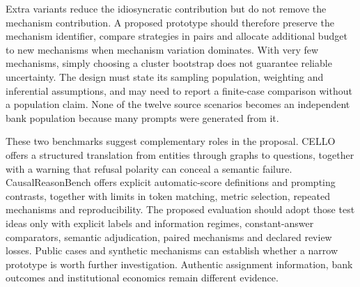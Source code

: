 Extra variants reduce the idiosyncratic contribution but do not remove the
mechanism contribution. A proposed prototype should therefore preserve the
mechanism identifier, compare strategies in pairs and allocate additional
budget to new mechanisms when mechanism variation dominates. With very few
mechanisms, simply choosing a cluster bootstrap does not guarantee reliable
uncertainty. The design must state its sampling population, weighting and
inferential assumptions, and may need to report a finite-case comparison
without a population claim. None of the twelve source scenarios becomes an
independent bank population because many prompts were generated from it.

These two benchmarks suggest complementary roles in the proposal. CELLO
offers a structured translation from entities through graphs to questions,
together with a warning that refusal polarity can conceal a semantic failure.
CausalReasonBench offers explicit automatic-score definitions and prompting
contrasts, together with limits in token matching, metric selection, repeated
mechanisms and reproducibility. The proposed evaluation should adopt those
test ideas only with explicit labels and information regimes, constant-answer
comparators, semantic adjudication, paired mechanisms and declared review
losses. Public cases and synthetic mechanisms can establish whether a narrow
prototype is worth further investigation. Authentic assignment information,
bank outcomes and institutional economics remain different evidence.
\citep{exec17_benchmark_cello,exec17_benchmark_cherif}
\label{exec17:benchmark-development-end}

